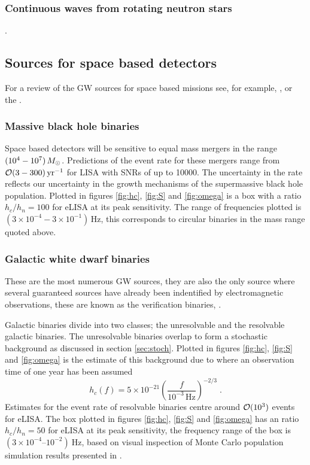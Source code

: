 \subsubsection{Continuous waves from rotating neutron stars}

{}.


\subsection{Sources for space based detectors}
For a review of the GW sources for space based missions see, for example, \cite{Amaro-Seoane-et-al}, \cite{Gairetal} or the \cite{eLISAyellowbook}.


\subsubsection{Massive black hole binaries}
Space based detectors will be sensitive to equal mass mergers in the range $(10^{4}-10^{7})\,M_{ \odot }$. Predictions of the event rate for these mergers range from ${\cal{O}}(3-300)\,\textrm{yr}^{-1}$ for LISA with SNRs of up to 10000. The uncertainty in the rate reflects our uncertainty in the growth mechanisms of the supermassive black hole population. Plotted in figures \ref{fig:hc}, \ref{fig:S} and \ref{fig:omega} is a box with a ratio $h_{c}/h_{n}=100$ for eLISA at its peak sensitivity. The range of frequencies plotted is $(3\times 10^{-4}-3\times 10^{-1})\,\textrm{Hz}$, this corresponds to circular binaries in the mass range quoted above.

\subsubsection{Galactic white dwarf binaries} \label{sec:GB}
These are the most numerous GW sources, they are also the only source where several guaranteed sources have already been indentified by electromagnetic observations, these are known as the verification binaries, \cite{2006CQGra..23S.809S}.

Galactic binaries divide into two classes; the unresolvable and the resolvable galactic binaries. The unresolvable binaries overlap to form a stochastic background as discussed in section \ref{sec:stoch}. Plotted in figures \ref{fig:hc}, \ref{fig:S} and \ref{fig:omega} is the estimate of this background 
due to \cite{Nelemans} where an observation time of one year has been assumed
\begin{equation} h_{c}(f)= 5\times 10^{-21} \left(\frac{f}{10^{-3}\,\textrm{Hz}}\right)^{-2/3} \; . \end{equation}
Estimates for the event rate of resolvable binaries centre around ${\cal{O}}(10^{3})$ events for eLISA. The box plotted in figures \ref{fig:hc}, \ref{fig:S} and \ref{fig:omega} has an ratio $h_{c}/h_{n}=50$ for eLISA at its peak sensitivity, the frequency range of the box is $\left(3\times10^{-4}\right.$--$\left.10^{-2}\right)~\mathrm{Hz}$, based on visual inspection of Monte Carlo population simulation results presented in \cite{Amaro-Seoane-et-al}.

